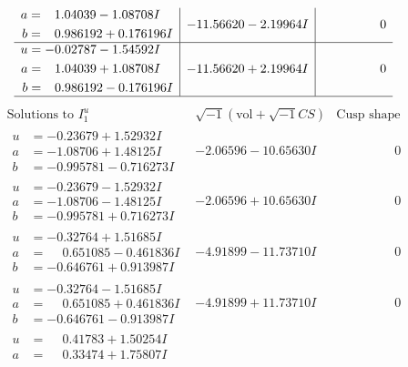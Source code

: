 \documentclass[1p]{elsarticle_modified}
\theoremstyle{definition}
\newcommand{\I}{\sqrt{-1}}
\begin{document}
$$\begin{array}{c|c|c}
\begin{aligned}
a &= \phantom{-}1.04039 - 1.08708 I \\
b &= \phantom{-}0.986192 + 0.176196 I\end{aligned}
 & -11.56620 - 2.19964 I & \phantom{-0.000000 } 0 \\ \hline\begin{aligned}
u &= -0.02787 - 1.54592 I \\
a &= \phantom{-}1.04039 + 1.08708 I \\
b &= \phantom{-}0.986192 - 0.176196 I\end{aligned}
 & -11.56620 + 2.19964 I & \phantom{-0.000000 } 0\\
 \hline 
 \end{array}$$\newpage$$\begin{array}{c|c|c}  
\text{Solutions to }I^u_{1}& \I (\text{vol} + \sqrt{-1}CS) & \text{Cusp shape}\\
 \hline 
\begin{aligned}
u &= -0.23679 + 1.52932 I \\
a &= -1.08706 + 1.48125 I \\
b &= -0.995781 - 0.716273 I\end{aligned}
 & -2.06596 - 10.65630 I & \phantom{-0.000000 } 0 \\ \hline\begin{aligned}
u &= -0.23679 - 1.52932 I \\
a &= -1.08706 - 1.48125 I \\
b &= -0.995781 + 0.716273 I\end{aligned}
 & -2.06596 + 10.65630 I & \phantom{-0.000000 } 0 \\ \hline\begin{aligned}
u &= -0.32764 + 1.51685 I \\
a &= \phantom{-}0.651085 - 0.461836 I \\
b &= -0.646761 + 0.913987 I\end{aligned}
 & -4.91899 - 11.73710 I & \phantom{-0.000000 } 0 \\ \hline\begin{aligned}
u &= -0.32764 - 1.51685 I \\
a &= \phantom{-}0.651085 + 0.461836 I \\
b &= -0.646761 - 0.913987 I\end{aligned}
 & -4.91899 + 11.73710 I & \phantom{-0.000000 } 0 \\ \hline\begin{aligned}
u &= \phantom{-}0.41783 + 1.50254 I \\
a &= \phantom{-}0.33474 + 1.75807 I \\

\end{aligned}
\end{array}$$
\end{document}
